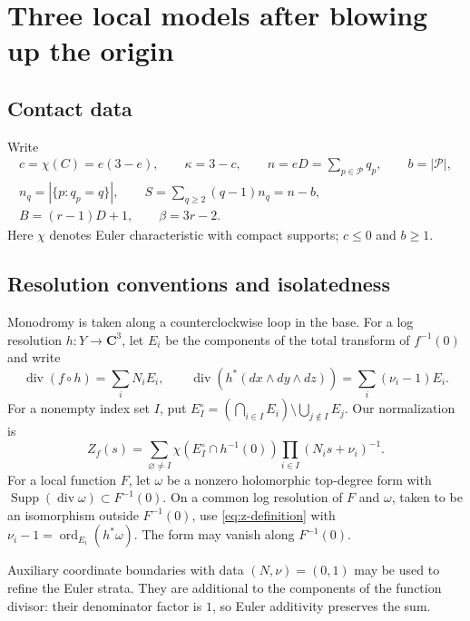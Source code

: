 \documentclass[11pt]{article}
\numberwithin{equation}{section}
\theoremstyle{definition}
\theoremstyle{remark}
\newcommand{\CC}{\mathbf C}
\DeclareMathOperator{\ord}{ord}
\begin{document}
\section{Three local models after blowing up the origin}
\label{sec:geometry}

\subsection{Contact data}

Write
\begin{equation}\label{eq:contact-data}
 \begin{gathered}
 c=\chi(C)=e(3-e),\qquad \kappa=3-c,\qquad
 n=eD=\sum_{p\in\mathcal P}q_p,\qquad b=|\mathcal P|,\\
 n_q=|\{p:q_p=q\}|,\qquad
 S=\sum_{q\ge2}(q-1)n_q=n-b,\\
 B=(r-1)D+1,\qquad \beta=3r-2.
 \end{gathered}
\end{equation}
Here $\chi$ denotes Euler characteristic with compact supports;
$c\le0$ and $b\ge1$.

\subsection{Resolution conventions and isolatedness}

Monodromy is taken along a counterclockwise loop in the base.
For a log resolution $h:Y\to\CC^3$, let $E_i$ be the components
of the total transform of $f^{-1}(0)$ and write
\[
 \operatorname{div}(f\circ h)=\sum_iN_iE_i,\qquad
 \operatorname{div}(h^*(dx\wedge dy\wedge dz))
       =\sum_i(\nu_i-1)E_i.
\]
For a nonempty index set $I$, put
$E_I^\circ=(\bigcap_{i\in I}E_i)\setminus\bigcup_{j\notin I}E_j$.
Our normalization is
\begin{equation}\label{eq:z-definition}
 Z_f(s)=\sum_{\varnothing\ne I}
  \chi(E_I^\circ\cap h^{-1}(0))
  \prod_{i\in I}(N_i s+\nu_i)^{-1}.
\end{equation}
For a local function $F$, let $\omega$ be a nonzero
holomorphic top-degree form with
$\operatorname{Supp}(\operatorname{div}\omega)\subset F^{-1}(0)$.
On a common log resolution of $F$ and $\omega$, taken to be an
isomorphism outside $F^{-1}(0)$, use \eqref{eq:z-definition}
with $\nu_i-1=\ord_{E_i}(h^*\omega)$.
The form may vanish along $F^{-1}(0)$.

Auxiliary coordinate boundaries with data $(N,\nu)=(0,1)$
may be used to refine the Euler strata. They are additional
to the components of the function divisor: their denominator
factor is $1$, so Euler additivity preserves the sum.
\end{document}
